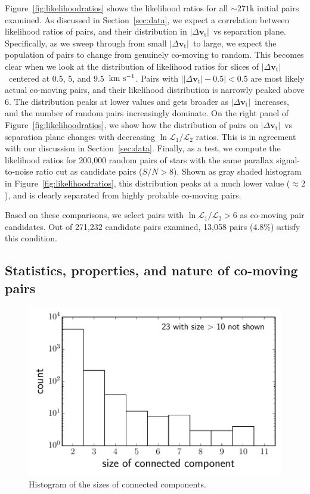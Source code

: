 \documentclass[manuscript, letterpaper]{aastex6}
\newcommand{\sectionname}{Section}
\newcommand{\bs}[1]{\boldsymbol{#1}}
\renewcommand{\vec}[1]{\bs{#1}}
\newcommand{\kms}{\ensuremath{\rm km~s^{-1}}}
\newcommand{\absdvtan}{\ensuremath{|\Delta\vec v_\mathrm{t}|}}
\begin{document}
Figure~\ref{fig:likelihoodratios} shows the likelihood ratios for all
$\sim 271$k initial pairs examined.
As discussed in \sectionname~\ref{sec:data}, we expect a correlation between likelihood
ratios of pairs, and their distribution in \absdvtan\ vs separation plane.
Specifically, as we sweep through from small \absdvtan\ to large, we expect
the population of pairs to change from genuinely co-moving to random.
This becomes clear when we look at the distribution of likelihood ratios for
slices of \absdvtan\ centered at 0.5, 5, and 9.5~\kms.
Pairs with $|\absdvtan -0.5|<0.5$ are most likely actual co-moving pairs, and
their likelihood distribution is narrowly peaked above 6.
The distribution peaks at lower values and gets broader as \absdvtan\ increases,
and the number of random pairs increasingly dominate.
On the right panel of Figure~\ref{fig:likelihoodratios}, we show
how the distribution of pairs on \absdvtan\ vs separation plane changes
with decreasing $\ln \mathcal{L}_1 /\mathcal{L}_2$ ratios.
This is in agreement with our discussion in \sectionname~\ref{sec:data}.
Finally, as a test,
we compute the likelihood ratios for 200,000 random pairs of stars with the same
parallax signal-to-noise ratio cut as candidate pairs ($S/N > 8$).
Shown as gray shaded histogram in Figure~\ref{fig:likelihoodratios},
this distribution peaks at a much lower value ($\approx 2$),
and is clearly separated from highly probable co-moving pairs.

Based on these comparisons, we select pairs with
$\ln \mathcal{L}_1 /\mathcal{L}_2 > 6$ as co-moving pair candidates.
Out of 271,232 candidate pairs examined, 13,058 pairs (4.8\%)
satisfy this condition.

\subsection{Statistics, properties, and nature of co-moving pairs}

\begin{figure}[htbp]
  \begin{center}
    \includegraphics[width=\textwidth]{figures/dist_networksize.pdf}
  \end{center}
  \caption{%
    Histogram of the sizes of connected components.
    \label{fig:hist_ccsize}}
\end{figure}
\end{document}
